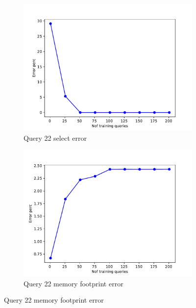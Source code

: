 \begin{figure}[!htb]
     \begin{subfigure}[t]{0.5\textwidth}
       \includegraphics[scale=0.4]{figs/tpch10/tpch10_sel22_error.pdf}
       \caption{Query 22 select error}
       \label{fig:tpch_sel22}
      \end{subfigure}
      \begin{subfigure}[t]{0.5\textwidth}
        \includegraphics[scale=0.4]{figs/tpch10/tpch10_q22_memerror.pdf}
        \caption{Query 22 memory footprint error}
        \label{fig:tpch_mem22}
      \end{subfigure}

\end{figure}



